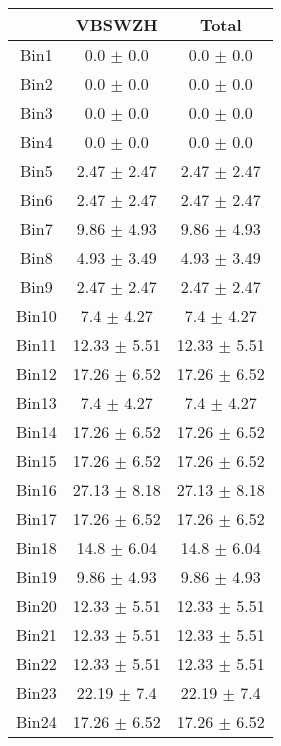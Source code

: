   \begin{tabular}{|c|c|c|}
  \hline
      & VBSWZH & Total \\ \cline{1-3} 
     \hline\hline
     Bin1 & 0.0 $\pm$ 0.0 & 0.0 $\pm$ 0.0 \\ \cline{1-3} 
     Bin2 & 0.0 $\pm$ 0.0 & 0.0 $\pm$ 0.0 \\ \cline{1-3} 
     Bin3 & 0.0 $\pm$ 0.0 & 0.0 $\pm$ 0.0 \\ \cline{1-3} 
     Bin4 & 0.0 $\pm$ 0.0 & 0.0 $\pm$ 0.0 \\ \cline{1-3} 
     Bin5 & 2.47 $\pm$ 2.47 & 2.47 $\pm$ 2.47 \\ \cline{1-3} 
     Bin6 & 2.47 $\pm$ 2.47 & 2.47 $\pm$ 2.47 \\ \cline{1-3} 
     Bin7 & 9.86 $\pm$ 4.93 & 9.86 $\pm$ 4.93 \\ \cline{1-3} 
     Bin8 & 4.93 $\pm$ 3.49 & 4.93 $\pm$ 3.49 \\ \cline{1-3} 
     Bin9 & 2.47 $\pm$ 2.47 & 2.47 $\pm$ 2.47 \\ \cline{1-3} 
     Bin10 & 7.4 $\pm$ 4.27 & 7.4 $\pm$ 4.27 \\ \cline{1-3} 
     Bin11 & 12.33 $\pm$ 5.51 & 12.33 $\pm$ 5.51 \\ \cline{1-3} 
     Bin12 & 17.26 $\pm$ 6.52 & 17.26 $\pm$ 6.52 \\ \cline{1-3} 
     Bin13 & 7.4 $\pm$ 4.27 & 7.4 $\pm$ 4.27 \\ \cline{1-3} 
     Bin14 & 17.26 $\pm$ 6.52 & 17.26 $\pm$ 6.52 \\ \cline{1-3} 
     Bin15 & 17.26 $\pm$ 6.52 & 17.26 $\pm$ 6.52 \\ \cline{1-3} 
     Bin16 & 27.13 $\pm$ 8.18 & 27.13 $\pm$ 8.18 \\ \cline{1-3} 
     Bin17 & 17.26 $\pm$ 6.52 & 17.26 $\pm$ 6.52 \\ \cline{1-3} 
     Bin18 & 14.8 $\pm$ 6.04 & 14.8 $\pm$ 6.04 \\ \cline{1-3} 
     Bin19 & 9.86 $\pm$ 4.93 & 9.86 $\pm$ 4.93 \\ \cline{1-3} 
     Bin20 & 12.33 $\pm$ 5.51 & 12.33 $\pm$ 5.51 \\ \cline{1-3} 
     Bin21 & 12.33 $\pm$ 5.51 & 12.33 $\pm$ 5.51 \\ \cline{1-3} 
     Bin22 & 12.33 $\pm$ 5.51 & 12.33 $\pm$ 5.51 \\ \cline{1-3} 
     Bin23 & 22.19 $\pm$ 7.4 & 22.19 $\pm$ 7.4 \\ \cline{1-3} 
     Bin24 & 17.26 $\pm$ 6.52 & 17.26 $\pm$ 6.52 \\ \cline{1-3} 

\end{tabular}
